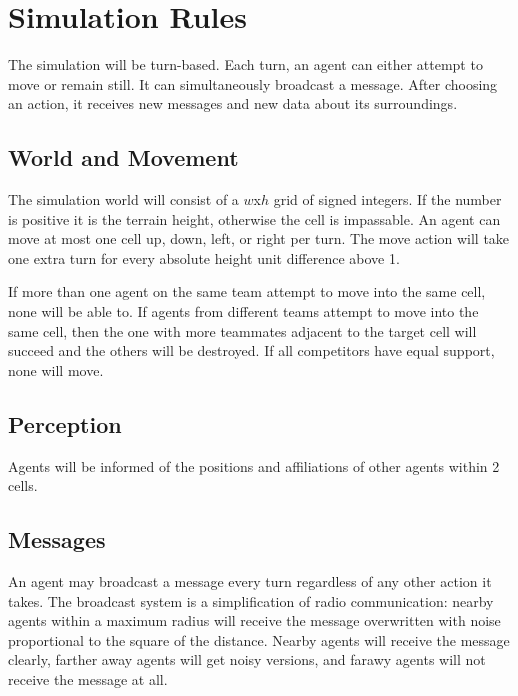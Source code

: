\section{Simulation Rules}

The simulation will be turn-based. Each turn, an agent can either attempt to move or remain still. It can simultaneously broadcast a message. After choosing an action, it receives new messages and new data about its surroundings.

\subsection{World and Movement}

The simulation world will consist of a $w$x$h$ grid of signed integers. If the number is positive it is the terrain height, otherwise the cell is impassable. An agent can move at most one cell up, down, left, or right per turn. The move action will take one extra turn for every absolute height unit difference above 1.

If more than one agent on the same team attempt to move into the same cell, none will be able to. If agents from different teams attempt to move into the same cell, then the one with more teammates adjacent to the target cell will succeed and the others will be destroyed. If all competitors have equal support, none will move.

\subsection{Perception}

Agents will be informed of the positions and affiliations of other agents within 2 cells.

\subsection{Messages}

An agent may broadcast a message every turn regardless of any other action it takes. The broadcast system is a simplification of radio communication: nearby agents within a maximum radius will receive the message overwritten with noise proportional to the square of the distance. Nearby agents will receive the message clearly, farther away agents will get noisy versions, and farawy agents will not receive the message at all.